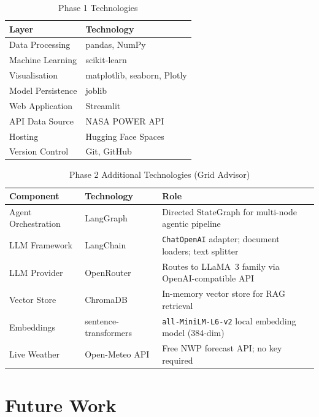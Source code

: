 \documentclass[12pt, a4paper]{article}
\begin{document}
\begin{table}[H]
    \centering
    \caption{Phase 1 Technologies}
    \begin{tabular}{ll}
        \toprule
        \textbf{Layer} & \textbf{Technology} \\
        \midrule
        Data Processing & pandas, NumPy \\
        Machine Learning & scikit-learn \\
        Visualisation & matplotlib, seaborn, Plotly \\
        Model Persistence & joblib \\
        Web Application & Streamlit \\
        API Data Source & NASA POWER API \\
        Hosting & Hugging Face Spaces \\
        Version Control & Git, GitHub \\
        \bottomrule
    \end{tabular}
\end{table}

\begin{table}[H]
    \centering
    \caption{Phase 2 Additional Technologies (Grid Advisor)}
    \begin{tabularx}{\textwidth}{llX}
        \toprule
        \textbf{Component} & \textbf{Technology} & \textbf{Role} \\
        \midrule
        Agent Orchestration & LangGraph & Directed StateGraph for multi-node agentic pipeline \\
        LLM Framework & LangChain & \texttt{ChatOpenAI} adapter; document loaders; text splitter \\
        LLM Provider & OpenRouter & Routes to LLaMA~3 family via OpenAI-compatible API \\
        Vector Store & ChromaDB & In-memory vector store for RAG retrieval \\
        Embeddings & sentence-transformers & \texttt{all-MiniLM-L6-v2} local embedding model (384-dim) \\
        Live Weather & Open-Meteo API & Free NWP forecast API; no key required \\
        \bottomrule
    \end{tabularx}
\end{table}

\newpage
\section{Future Work}
\end{document}
